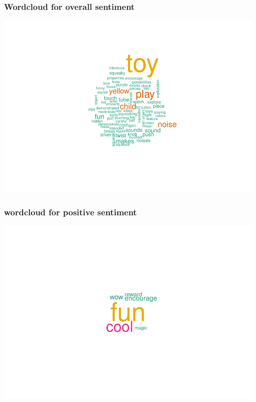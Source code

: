\documentclass[
  english,
  man]{apa6}
\begin{document}
\hypertarget{wordcloud-for-overall-sentiment}{%
\subsubsection{Wordcloud for overall sentiment}\label{wordcloud-for-overall-sentiment}}

\includegraphics{capstone640_files/figure-latex/unnamed-chunk-1-1.pdf}

\hypertarget{wordcloud-for-positive-sentiment}{%
\subsubsection{wordcloud for positive sentiment}\label{wordcloud-for-positive-sentiment}}

\includegraphics{capstone640_files/figure-latex/unnamed-chunk-2-1.pdf}
\end{document}
